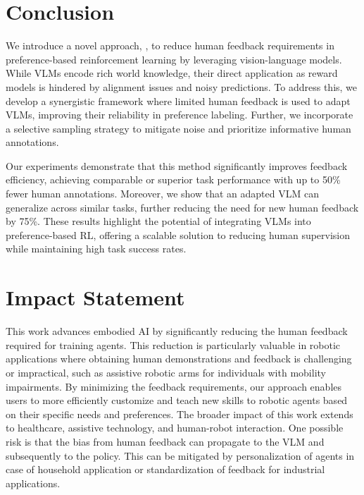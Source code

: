 \section{Conclusion}
We introduce a novel approach, \algo, to reduce human feedback requirements in preference-based reinforcement learning by leveraging vision-language models. While VLMs encode rich world knowledge, their direct application as reward models is hindered by alignment issues and noisy predictions. To address this, we develop a synergistic framework where limited human feedback is used to adapt VLMs, improving their reliability in preference labeling. Further, we incorporate a selective sampling strategy to mitigate noise and prioritize informative human annotations.

Our experiments demonstrate that this method significantly improves feedback efficiency, achieving comparable or superior task performance with up to 50\% fewer human annotations. Moreover, we show that an adapted VLM can generalize across similar tasks, further reducing the need for new human feedback by 75\%. These results highlight the potential of integrating VLMs into preference-based RL, offering a scalable solution to reducing human supervision while maintaining high task success rates. 

\section*{Impact Statement}
This work advances embodied AI by significantly reducing the human feedback required for training agents. This reduction is particularly valuable in robotic applications where obtaining human demonstrations and feedback is challenging or impractical, such as assistive robotic arms for individuals with mobility impairments. By minimizing the feedback requirements, our approach enables users to more efficiently customize and teach new skills to robotic agents based on their specific needs and preferences. The broader impact of this work extends to healthcare, assistive technology, and human-robot interaction. One possible risk is that the bias from human feedback can propagate to the VLM and subsequently to the policy. This can be mitigated by personalization of agents in case of household application or standardization of feedback for industrial applications. 